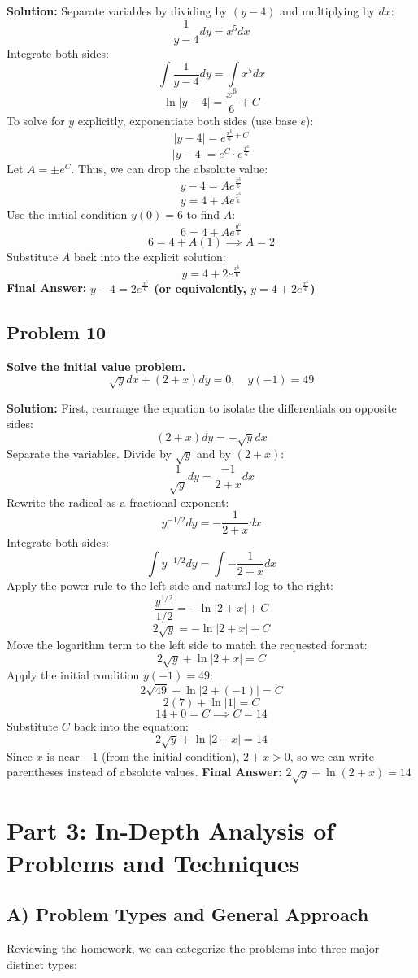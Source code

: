 \documentclass[11pt]{article}
\begin{document}
\textbf{Solution:}
Separate variables by dividing by $(y-4)$ and multiplying by $dx$:
\[ \frac{1}{y-4} dy = x^5 dx \]
Integrate both sides:
\[ \int \frac{1}{y-4} dy = \int x^5 dx \]
\[ \ln|y-4| = \frac{x^6}{6} + C \]
To solve for $y$ explicitly, exponentiate both sides (use base $e$):
\[ |y-4| = e^{\frac{x^6}{6} + C} \]
\[ |y-4| = e^C \cdot e^{\frac{x^6}{6}} \]
Let $A = \pm e^C$. Thus, we can drop the absolute value:
\[ y - 4 = A e^{\frac{x^6}{6}} \]
\[ y = 4 + A e^{\frac{x^6}{6}} \]
Use the initial condition $y(0) = 6$ to find $A$:
\[ 6 = 4 + A e^{\frac{0^6}{6}} \]
\[ 6 = 4 + A(1) \implies A = 2 \]
Substitute $A$ back into the explicit solution:
\[ y = 4 + 2e^{\frac{x^6}{6}} \]
\textbf{Final Answer:} \textbf{$y - 4 = 2 e^{\frac{x^6}{6}}$ (or equivalently, $y = 4 + 2 e^{\frac{x^6}{6}}$)}

\vspace{0.5cm}
\subsection*{Problem 10}
\textbf{Solve the initial value problem.}
\[ \sqrt{y} dx + (2+x)dy = 0, \quad y(-1) = 49 \]

\textbf{Solution:}
First, rearrange the equation to isolate the differentials on opposite sides:
\[ (2+x)dy = -\sqrt{y} dx \]
Separate the variables. Divide by $\sqrt{y}$ and by $(2+x)$:
\[ \frac{1}{\sqrt{y}} dy = \frac{-1}{2+x} dx \]
Rewrite the radical as a fractional exponent:
\[ y^{-1/2} dy = -\frac{1}{2+x} dx \]
Integrate both sides:
\[ \int y^{-1/2} dy = \int -\frac{1}{2+x} dx \]
Apply the power rule to the left side and natural log to the right:
\[ \frac{y^{1/2}}{1/2} = -\ln|2+x| + C \]
\[ 2\sqrt{y} = -\ln|2+x| + C \]
Move the logarithm term to the left side to match the requested format:
\[ 2\sqrt{y} + \ln|2+x| = C \]
Apply the initial condition $y(-1) = 49$:
\[ 2\sqrt{49} + \ln|2 + (-1)| = C \]
\[ 2(7) + \ln|1| = C \]
\[ 14 + 0 = C \implies C = 14 \]
Substitute $C$ back into the equation:
\[ 2\sqrt{y} + \ln|2+x| = 14 \]
Since $x$ is near $-1$ (from the initial condition), $2+x > 0$, so we can write parentheses instead of absolute values.
\newline
\textbf{Final Answer:} \textbf{$2\sqrt{y} + \ln(2+x) = 14$}

\newpage
\section{Part 3: In-Depth Analysis of Problems and Techniques}

\subsection{A) Problem Types and General Approach}
Reviewing the homework, we can categorize the problems into three major distinct types:
\end{document}
